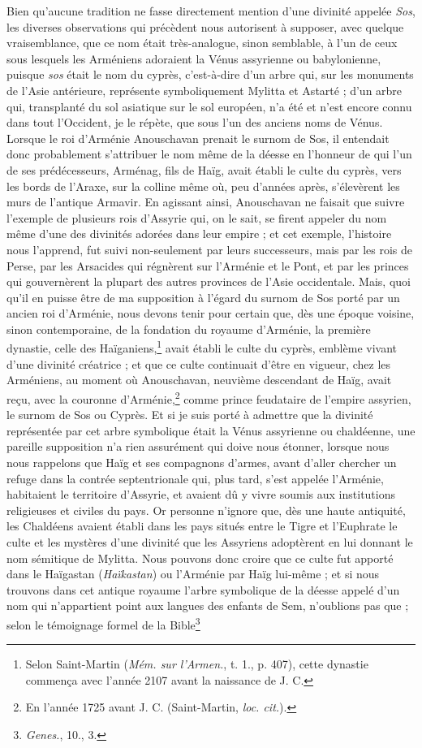 \documentclass[a4paper, 11pt, oneside, polutonikogreek, french]{article}
\begin{document}
Bien qu'aucune tradition ne fasse directement mention d'une divinité appelée \emph{Sos}, les diverses observations qui précèdent nous autorisent à supposer, avec quelque vraisemblance, que ce nom était très-analogue, sinon semblable, à l'un de ceux sous lesquels les Arméniens adoraient la Vénus assyrienne ou babylonienne, puisque \emph{sos} était le nom du cyprès, c'est-à-dire d'un arbre qui, sur les monuments de l'Asie antérieure, représente symboliquement Mylitta et Astarté ; d'un arbre qui, transplanté du sol asiatique sur le sol européen, n'a été et n'est encore connu dans tout l'Occident, je le répète, que sous l'un des anciens noms de Vénus. Lorsque le roi d'Arménie Anouschavan prenait le surnom de Sos, il entendait donc probablement s'attribuer le nom même de la déesse en l'honneur de qui l'un de ses prédécesseurs, Arménag, fils de Haïg, avait établi le culte du cyprès, vers les bords de l'Araxe, sur la colline même où, peu d'années après, s'élevèrent les murs de l'antique Armavir. En agissant ainsi, Anouschavan ne faisait que suivre l'exemple de plusieurs rois d'Assyrie qui, on le sait, se firent appeler du nom même d'une des divinités adorées dans leur empire ; et cet exemple, l'histoire nous l'apprend, fut suivi non-seulement par leurs successeurs, mais par les rois de Perse, par les Arsacides qui régnèrent sur l'Arménie et le Pont, et par les princes qui gouvernèrent la plupart des autres provinces de l'Asie occidentale. Mais, quoi qu'il en puisse être de ma supposition à l'égard du surnom de Sos porté par un ancien roi d'Arménie, nous devons tenir pour certain que, dès une époque voisine, sinon contemporaine, de la fondation du royaume d'Arménie, la première dynastie, celle des Haïganiens,\footnote{Selon Saint-Martin (\emph{Mém. sur l'Armen.}, t. 1., p. 407), cette dynastie commença avec l'année 2107 avant la naissance de J. C.} avait établi le culte du cyprès, emblème vivant d'une divinité créatrice ; et que ce culte continuait d'être en vigueur, chez les Arméniens, au moment où Anouschavan, neuvième descendant de Haïg, avait reçu, avec la couronne d'Arménie,\footnote{En l'année 1725 avant J. C. (Saint-Martin, \emph{loc. cit.}).} comme prince feudataire de l'empire assyrien, le surnom de Sos ou Cyprès. Et si je suis porté à admettre que la divinité représentée par cet arbre symbolique était la Vénus assyrienne ou chaldéenne, une pareille supposition n'a rien assurément qui doive nous étonner, lorsque nous nous rappelons que Haïg et ses compagnons d'armes, avant d'aller chercher un refuge dans la contrée septentrionale qui, plus tard, s'est appelée l'Arménie, habitaient le territoire d'Assyrie, et avaient dû y vivre soumis aux institutions religieuses et civiles du pays. Or personne n'ignore que, dès une haute antiquité, les Chaldéens avaient établi dans les pays situés entre le Tigre et l'Euphrate le culte et les mystères d'une divinité que les Assyriens adoptèrent en lui donnant le nom sémitique de Mylitta. Nous pouvons donc croire que ce culte fut apporté dans le Haïgastan (\emph{Haïkastan}) ou l'Arménie par Haïg lui-même ; et si nous trouvons dans cet antique royaume l'arbre symbolique de la déesse appelé d'un nom qui n'appartient point aux langues des enfants de Sem, n'oublions pas que ; selon le témoignage formel de la Bible\footnote{\emph{Genes.}, 10., 3.} 
\end{document}
